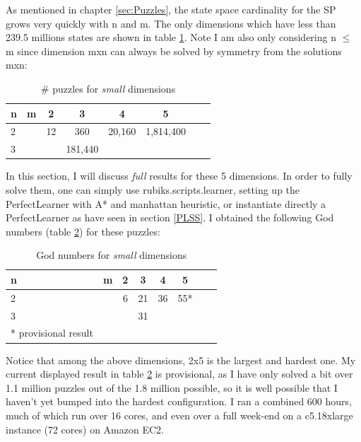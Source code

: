 As mentioned in chapter \ref{sec:Puzzles}, the state space cardinality for the SP grows very quickly with n and m. The only dimensions which have less than 239.5 millions states are shown in table \ref{tab:smallSP}. Note I am also only considering n $\leq$ m since dimension mxn can always be solved by symmetry from the solutions mxn:

\begin{table}[H]
\begin{center}
\begin{tabular}{l*{6}{c}r}
n              & m & 2 & 3 & 4 & 5\\
\hline
2              &   & 12 & 360 & 20,160 & 1,814,400 \\
3              &   &   & 181,440 &  &    \\
\end{tabular}
\caption{\label{tab:smallSP}\# puzzles for \textit{small} dimensions}
\end{center}
\end{table}
In this section, I will discuss \textit{full} results for these 5 dimensions. In order to fully solve them, one can simply use rubiks.scripts.learner, setting up the PerfectLearner with A* and manhattan heuristic, or instantiate directly a PerfectLearner as have seen in section \ref{PLSS}. I obtained the following God numbers (table \ref{tab:smallSPGN}) for these puzzles:
\begin{table}[H]
\begin{center}
\begin{tabular}{l*{6}{c}r}
n              & m & 2 & 3 & 4 & 5\\
\hline
2              &   & 6 & 21 & 36 & 55* \\
3              &   &   & 31 &  &    \\
* \tiny{provisional result}
\end{tabular}
\caption{\label{tab:smallSPGN}God numbers for \textit{small} dimensions}
\end{center}
\end{table}
Notice that among the above dimensions, 2x5 is the largest and hardest one. My current displayed result in table \ref{tab:smallSPGN} is provisional, as I have only solved a bit over 1.1 million puzzles out of the 1.8 million possible, so it is well possible that I haven't yet bumped into the hardest configuration. I ran a combined 600 hours, much of which run over 16 cores, and even over a full week-end on a c5.18xlarge instance (72 cores) on Amazon EC2.
\\
